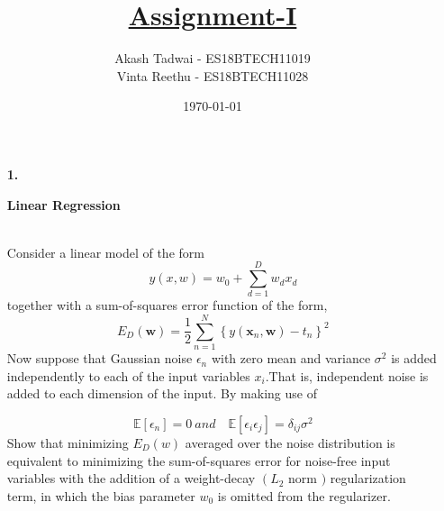 \documentclass[english,a4paper,12pt]{article}
\title{\textbf{\underline{\Huge{Assignment-I }}}}
\author{Akash Tadwai - ES18BTECH11019 \\ Vinta Reethu - ES18BTECH11028}
\date{\today}
\begin{document}
\maketitle
\begin{enumerate}
   \item[\textbf{1.}] { \begin{center}
       \large{\textbf{Linear Regression}}  \\~\\
   \end{center}
   Consider a linear model of the form
$$
y(x, w)=w_{0}+\sum_{d=1}^{D} w_{d} x_{d}
$$
together with a sum-of-squares error function of the form,  
$$ E_{D}(\boldsymbol{w})=\frac{1}{2} \sum_{n=1}^{N}\left\{y\left(\boldsymbol{x}_{n}, \boldsymbol{w}\right)-t_{n}\right\}^2 $$
Now suppose that Gaussian noise $\epsilon_{n}$ with zero mean and variance $\sigma^{2}$ is added independently to each of the input variables $x_{i} .$That
is, independent noise is added to each dimension of the input. By making use of

$$
 \mathbb{E}\left[\epsilon_{n}\right]=0 \ and \quad \mathbb{E}\left[\epsilon_{i} \epsilon_{j}\right]=\delta_{ij}\sigma^2
$$
Show that minimizing $E_{D}(w)$ averaged over the noise distribution is equivalent to minimizing the sum-of-squares error for noise-free input variables with the addition of a weight-decay $\left(L_{2}\right.$ norm $)$ regularization term, in which the bias parameter $w_{0}$ is omitted from the regularizer.} \newline


\end{enumerate}
\end{document}
